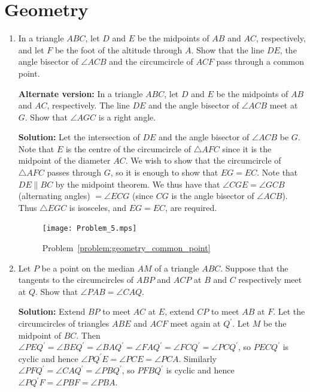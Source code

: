 \documentclass{article}
\newcommand{\solution}[1]{%
\ifsolutions%
    \textbf{Solution: } #1
\fi
}
\begin{document}
\section{Geometry}
\begin{enumerate}

\item\label{problem:geometry_common_point} %
In a triangle $ABC$, let $D$ and $E$ be the midpoints of $AB$ and $AC$, respectively, and let $F$ be the foot of the altitude through $A$. Show that the line $DE$, the angle bisector of $\angle ACB$ and the circumcircle of $ACF$ pass through a common point.

\textbf{Alternate version:} In a triangle $ABC$, let $D$ and $E$ be the midpoints of $AB$ and $AC$, respectively. The line $DE$ and the angle bisector of $\angle ACB$ meet at $G$. Show that $\angle AGC$ is a right angle.

\solution{%
Let the intersection of $DE$ and the angle bisector of $\angle ACB$ be $G$. Note that $E$ is the centre of the circumcircle of $\triangle AFC$ since it is the midpoint of the diameter $AC$. We wish to show that the circumcircle of $\triangle AFC$ passes through $G$, so it is enough to show that $EG = EC$. Note that $DE \parallel BC$ by the midpoint theorem. We thus have that $\angle CGE = \angle GCB$ (alternating angles) $ = \angle ECG$ (since $CG$ is the angle bisector of $\angle ACB$). Thus $\triangle EGC$ is isosceles, and $EG = EC$, are required.

\begin{figure}[!ht]
\centering
\caption{Problem~\ref{problem:geometry_common_point}}\label{fig:geometry_common_point}
\texttt{[image: Problem\_5.mps]}
\end{figure}
}

\item Let $P$ be a point on the median $AM$ of a triangle $ABC$. Suppose that the tangents to the circumcircles of $ABP$ and $ACP$ at $B$ and $C$ respectively meet at $Q$. Show that $\angle PAB = \angle CAQ$.

\solution{%
Extend $BP$ to meet $AC$ at $E$, extend $CP$ to meet $AB$ at $F$. Let the circumcircles of triangles $ABE$ and $ACF$ meet again at $Q^\prime$. Let $M$ be the midpoint of $BC$. Then $\angle PEQ^\prime = \angle BEQ^\prime = \angle BAQ^\prime = \angle FAQ^\prime = \angle FCQ^\prime = \angle PCQ^\prime$, so $PECQ^\prime$ is cyclic and hence $\angle PQ^\prime E = \angle PCE = \angle PCA$. Similarly $\angle PFQ^\prime = \angle CAQ^\prime = \angle PBQ^\prime$, so $PFBQ^\prime$ is cyclic and hence $\angle PQ^\prime F = \angle PBF = \angle PBA$.

}
\end{enumerate}
\end{document}
